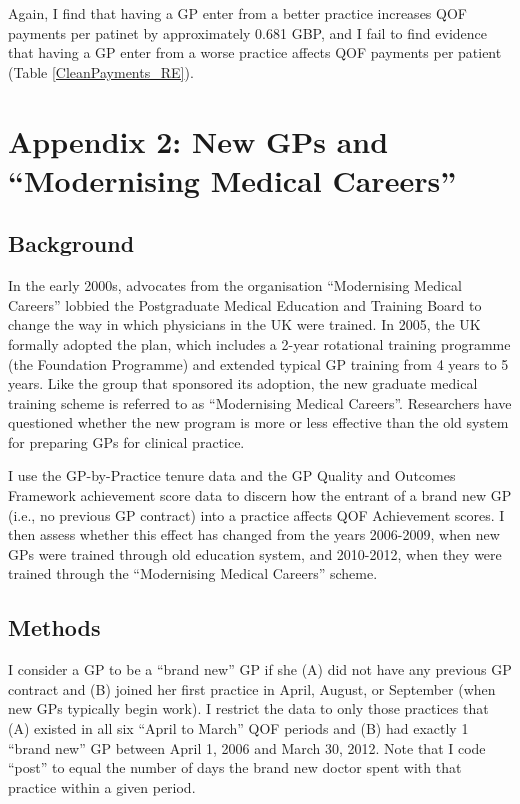 \documentclass[11pt]{article}
\begin{document}
Again, I find that having a GP enter from a better practice increases QOF payments per patinet by approximately 0.681 GBP, and I fail to find evidence that having a GP enter from a worse practice affects QOF payments per patient (Table \ref{CleanPayments_RE}).


\section{Appendix 2: New GPs and ``Modernising Medical Careers''}

\subsection{Background}

In the early 2000s, advocates from the organisation ``Modernising Medical Careers'' lobbied the Postgraduate Medical Education and Training Board to change the way in which physicians in the UK were trained. In 2005, the UK formally adopted the plan, which includes a 2-year rotational training programme (the Foundation Programme) and extended typical GP training from 4 years to 5 years. Like the group that sponsored its adoption, the new graduate medical training scheme is referred to as ``Modernising Medical Careers''. Researchers have questioned whether the new program is more or less effective than the old system for preparing GPs for clinical practice.

I use the GP-by-Practice tenure data and the GP Quality and Outcomes Framework achievement score data to discern how the entrant of a brand new GP (i.e., no previous GP contract) into a practice affects QOF Achievement scores. I then assess whether this effect has changed from the years 2006-2009, when new GPs were trained through old education system, and 2010-2012, when they were trained through the ``Modernising Medical Careers'' scheme.

\subsection{Methods}
I consider a GP to be a ``brand new'' GP if she (A) did not have any previous GP contract and (B) joined her first practice in April, August, or September (when new GPs typically begin work). I restrict the data to only those practices that (A) existed in all six ``April to March'' QOF periods and (B) had exactly 1 ``brand new'' GP between April 1, 2006 and March 30, 2012. Note that I code ``post'' to equal the number of days the brand new doctor spent with that practice within a given period.
\end{document}
